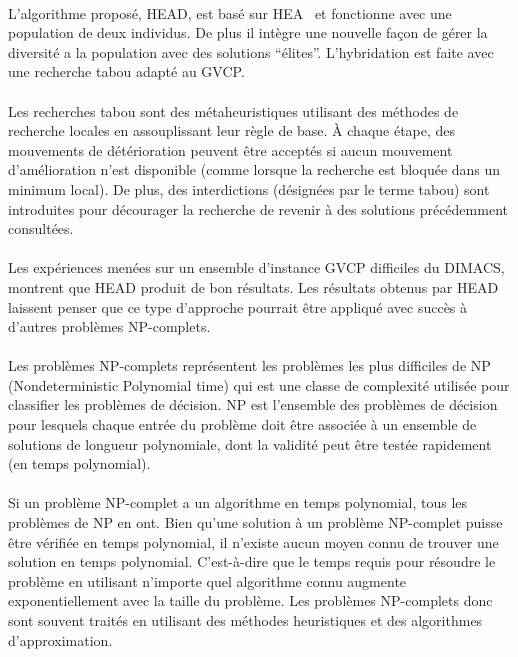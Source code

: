 \documentclass[a4paper,11pt,twoside,french,report]{../common/simplem}
\begin{document}
				\paragraph*{}
					L'algorithme proposé, \gls{HEAD}, est basé sur \gls{HEA}~\cite{Galinier1999} et fonctionne avec une population de deux individus. De plus il intègre une nouvelle façon de gérer la diversité a la population avec des solutions ``élites''. L'hybridation est faite avec une recherche tabou adapté au \gls{GVCP}.
				\paragraph*{}
					Les recherches tabou sont des métaheuristiques utilisant des méthodes de recherche locales en assouplissant leur règle de base. À chaque étape, des mouvements de détérioration peuvent être acceptés si aucun mouvement d'amélioration n'est disponible (comme lorsque la recherche est bloquée dans un minimum local). De plus, des interdictions (désignées par le terme tabou) sont introduites pour décourager la recherche de revenir à des solutions précédemment consultées.
				\paragraph*{}
					Les expériences menées sur un ensemble d'instance \gls{GVCP} difficiles du \gls{DIMACS}, montrent que \gls{HEAD} produit de bon résultats. Les résultats obtenus par \gls{HEAD} laissent penser que ce type d'approche pourrait être appliqué avec succès à d'autres problèmes NP-complets.
				\paragraph*{}
					Les problèmes NP-complets représentent les problèmes les plus difficiles de NP (Nondeterministic Polynomial time) qui est une classe de complexité utilisée pour classifier les problèmes de décision. NP est l'ensemble des problèmes de décision pour lesquels chaque entrée du problème doit être associée à un ensemble de solutions de longueur polynomiale, dont la validité peut être testée rapidement (en temps polynomial).
				\paragraph*{}
					Si un problème NP-complet a un algorithme en temps polynomial, tous les problèmes de NP en ont. Bien qu'une solution à un problème NP-complet puisse être vérifiée en temps polynomial, il n'existe aucun moyen connu de trouver une solution en temps polynomial. C'est-à-dire que le temps requis pour résoudre le problème en utilisant n'importe quel algorithme connu augmente exponentiellement avec la taille du problème. Les problèmes NP-complets donc sont souvent traités en utilisant des méthodes heuristiques et des algorithmes d'approximation.
\end{document}

